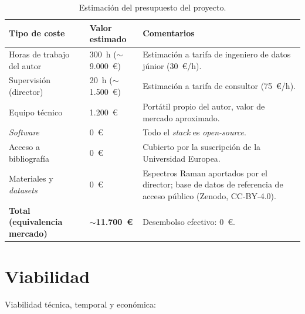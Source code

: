 \begin{table}[H]
  \centering
  \small
  \begin{tabular}{@{}p{}p{}p{}@{}}
    \toprule
    \textbf{Tipo de coste} & \textbf{Valor estimado} & \textbf{Comentarios} \\
    \midrule
    Horas de trabajo del autor & 300~h ($\sim$9.000~\euro) & Estimación a tarifa de ingeniero de datos júnior (30~\euro/h). \\
    \addlinespace
    Supervisión (director) & 20~h ($\sim$1.500~\euro) & Estimación a tarifa de consultor (75~\euro/h). \\
    \addlinespace
    Equipo técnico & 1.200~\euro{} & Portátil propio del autor, valor de mercado aproximado. \\
    \addlinespace
    \textit{Software} & 0~\euro{} & Todo el \textit{stack} es \textit{open-source}. \\
    \addlinespace
    Acceso a bibliografía & 0~\euro{} & Cubierto por la suscripción de la Universidad Europea. \\
    \addlinespace
    Materiales y \textit{datasets} & 0~\euro{} & Espectros Raman aportados por el director; base de datos de referencia de acceso público (Zenodo, CC-BY-4.0). \\
    \midrule
    \textbf{Total (equivalencia mercado)} & \textbf{$\sim$11.700~\euro} & Desembolso efectivo: 0~\euro. \\
    \bottomrule
  \end{tabular}
  \caption{Estimación del presupuesto del proyecto.}
  \label{tab:costes}
\end{table}

\section{Viabilidad}

Viabilidad técnica, temporal y económica:

